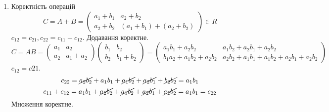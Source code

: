 \documentclass[11pt, a4paper]{article} %
\begin{document}
\begin{enumerate}
    \item Коректність операцій\\
    \[C = A+B = \begin{pmatrix}
        a_1 + b_1 & a_2 + b_2 \\ a_2 + b_2 & (a_1 + b_1) + (a_2 + b_2)
    \end{pmatrix} \in R\]
    $c_{12} = c_{21}, c_{22} = c_{11}+c_{12}$.
    Додавання коректне.
    \[C = AB = 
    \begin{pmatrix}
        a_1 & a_2 \\ a_2 & a_1 + a_2
    \end{pmatrix} 
    \begin{pmatrix}
        b_1 & b_2\\ b_2 & b_1 + b_2
    \end{pmatrix} = 
    \begin{pmatrix}
        a_1b_1 + a_2b_2 & a_1b_2 + a_2b_1 + a_2b_2 \\ b_1a_2 + a_1b_2 + a_2b_2 & a_2b_2 + a_1b_1 + a_1b_2 + a_2b_1 + a_2b_2 
    \end{pmatrix}\]
    $c_{12} = c{21}$.
    \[c_{22} = \cancel{a_2b_2} + a_1b_1 + \cancel{a_1b_2} + \cancel{a_2b_1} + \cancel{b_2b_2}  = a_1b_1 \]
    \[c_{11}+c_{12} = a_1b_1+ \cancel{a_2b_2}+\cancel{a_1b_2} + \cancel{a_2b_1} + \cancel{a_2b_2} = a_1b_1 = c_{22}\]
    Множення коректне.


\end{enumerate}
\end{document}

